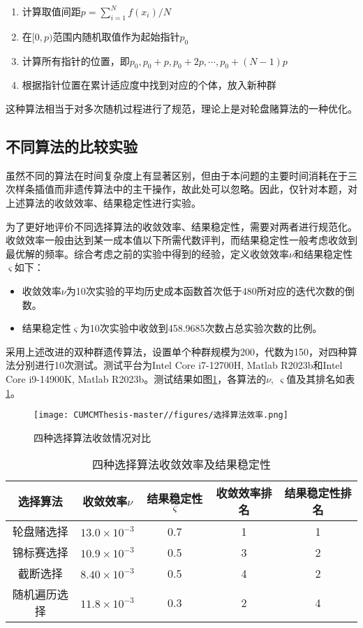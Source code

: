 \documentclass[withoutpreface,bwprint]{cumcmthesis} %
\begin{document}
\begin{enumerate}
    \item 计算取值间距$p=\sum^{N}_{i=1}f(x_i)/N$
    \item 在$[0,p)$范围内随机取值作为起始指针$p_0$
    \item 计算所有指针的位置，即$p_0,p_0+p,p_0+2p,\cdots ,p_0+(N-1)p$
    \item 根据指针位置在累计适应度中找到对应的个体，放入新种群
\end{enumerate}

这种算法相当于对多次随机过程进行了规范，理论上是对轮盘赌算法的一种优化。

\subsection{不同算法的比较实验}

虽然不同的算法在时间复杂度上有显著区别，但由于本问题的主要时间消耗在于三次样条插值而非遗传算法中的主干操作，故此处可以忽略。因此，仅针对本题，对上述算法的收敛效率、结果稳定性进行实验。

为了更好地评价不同选择算法的收敛效率、结果稳定性，需要对两者进行规范化。收敛效率一般由达到某一成本值以下所需代数评判，而结果稳定性一般考虑收敛到最优解的频率。综合考虑之前的实验中得到的经验，定义收敛效率$\nu$和结果稳定性$\varsigma$如下：

\begin{itemize}
    \item 收敛效率$\nu$为10次实验的平均历史成本函数首次低于480所对应的迭代次数的倒数。
    \item 结果稳定性$\varsigma$为10次实验中收敛到458.9685次数占总实验次数的比例。
\end{itemize}

采用上述改进的双种群遗传算法，设置单个种群规模为200，代数为150，对四种算法分别进行10次测试。测试平台为Intel Core i7-12700H, Matlab R2023b和Intel Core i9-14900K, Matlab R2023b。测试结果如图\ref{fig:select}，各算法的$\nu,\ \varsigma$值及其排名如表\ref{tab:select}。

\begin{figure}[htbp]
    \centering
    \texttt{[image: CUMCMThesis-master//figures/选择算法效率.png]}
    \caption{四种选择算法收敛情况对比}
    \label{fig:select}
\end{figure}

\begin{table}[htbp]
    \centering
    \caption{四种选择算法收敛效率及结果稳定性}
    \begin{tabular}{ccccc}
    \toprule
        选择算法 & 收敛效率$\nu$ & 结果稳定性$\varsigma$ & 收敛效率排名 & 结果稳定性排名 \\
    \midrule
        轮盘赌选择 & $13.0\times 10^{-3}$ & 0.7 & 1 & 1\\
        锦标赛选择 & $10.9\times 10^{-3}$ & 0.5 & 3 & 2\\
        截断选择 & $8.40\times 10^{-3}$ & 0.5 & 4 & 2\\
        随机遍历选择 & $11.8\times 10^{-3}$ & 0.3 & 2 & 4\\
    \bottomrule
    \end{tabular}
    \label{tab:select}
\end{table}
\end{document}

